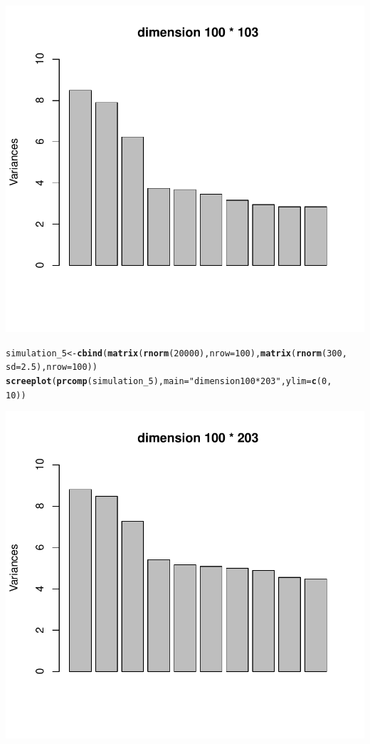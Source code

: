 \documentclass{article}\usepackage[]{graphicx}\usepackage[]{color}
\makeatletter
\def\maxwidth{ %
  \ifdim\Gin@nat@width>\linewidth
    \linewidth
  \else
    \Gin@nat@width
  \fi
}
\newcommand{\hlnum}[1]{\textcolor[rgb]{0.686,0.059,0.569}{#1}}%
\newcommand{\hlstr}[1]{\textcolor[rgb]{0.192,0.494,0.8}{#1}}%
\newcommand{\hlstd}[1]{\textcolor[rgb]{0.345,0.345,0.345}{#1}}%
\newcommand{\hlkwb}[1]{\textcolor[rgb]{0.69,0.353,0.396}{#1}}%
\newcommand{\hlkwc}[1]{\textcolor[rgb]{0.333,0.667,0.333}{#1}}%
\newcommand{\hlkwd}[1]{\textcolor[rgb]{0.737,0.353,0.396}{\textbf{#1}}}%
\newenvironment{kframe}{%
 \def\at@end@of@kframe{}%
 \ifinner\ifhmode%
  \def\at@end@of@kframe{\end{minipage}}%
  \begin{minipage}{\columnwidth}%
 \fi\fi%
 \def\FrameCommand##1{\hskip\@totalleftmargin \hskip-\fboxsep
 \colorbox{shadecolor}{##1}\hskip-\fboxsep
     \hskip-\linewidth \hskip-\@totalleftmargin \hskip\columnwidth}%
 \MakeFramed {\advance\hsize-\width
   \@totalleftmargin\z@ \linewidth\hsize
   \@setminipage}}%
 {\par\unskip\endMakeFramed%
 \at@end@of@kframe}
\newenvironment{knitrout}{}{} %
\makeatother
\begin{document}
\begin{knitrout}
{\centering \includegraphics[width=\maxwidth]{figure/minimal-Problem_55} 

}


\begin{kframe}\begin{alltt}
\hlstd{simulation_5} \hlkwb{<-} \hlkwd{cbind}\hlstd{(}\hlkwd{matrix}\hlstd{(}\hlkwd{rnorm}\hlstd{(}\hlnum{20000}\hlstd{),} \hlkwc{nrow} \hlstd{=} \hlnum{100}\hlstd{),} \hlkwd{matrix}\hlstd{(}\hlkwd{rnorm}\hlstd{(}\hlnum{300}\hlstd{,}
    \hlkwc{sd} \hlstd{=} \hlnum{2.5}\hlstd{),} \hlkwc{nrow} \hlstd{=} \hlnum{100}\hlstd{))}
\hlkwd{screeplot}\hlstd{(}\hlkwd{prcomp}\hlstd{(simulation_5),} \hlkwc{main} \hlstd{=} \hlstr{"dimension 100 * 203"}\hlstd{,} \hlkwc{ylim} \hlstd{=} \hlkwd{c}\hlstd{(}\hlnum{0}\hlstd{,}
    \hlnum{10}\hlstd{))}
\end{alltt}
\end{kframe}

{\centering \includegraphics[width=\maxwidth]{figure/minimal-Problem_56} 

}
\end{knitrout}
\end{document}
